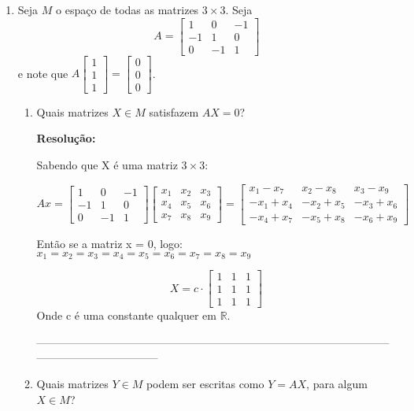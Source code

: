 \documentclass[leqno]{article}
\numberwithin{equation}{section}
\theoremstyle{definition}
\newcommand{\bR}{\mathbb{R}}
\newcommand{\bveccc}[3]{%
		\begin{bmatrix} #1 \\ #2 \\ #3  \end{bmatrix}
	}
\newenvironment{sol}
	{
		\vspace{4mm}
		\noindent\textbf{Resolução:}
		\strut\newline
		\smallskip
		\hspace{-3.5mm}
	}
	{}
\begin{document}
\begin{enumerate}
		\item Seja $M$ o espaço de todas as matrizes $3 \times 3$. Seja
		$$A = \begin{bmatrix}
			1 & 0 & -1 \\
			-1 & 1 & 0 \\
			0 & -1 & 1
		\end{bmatrix}$$
		e note que $A \bveccc{1}{1}{1} = \bveccc{0}{0}{0}$.
		
		\begin{enumerate}
			
			\item Quais matrizes $X \in M$ satisfazem $AX = 0$?
			
			\begin{sol} 
			Sabendo que X é uma matriz $3 \times 3$:
			
			$$Ax = 
			\begin{bmatrix}
			1 & 0 & -1 \\
			-1 & 1 & 0 \\
			0 & -1 & 1
			\end{bmatrix}
			\begin{bmatrix}
			x_1 & x_2 & x_3 \\
			x_4 & x_5 & x_6 \\
			x_7 & x_8 & x_9
			\end{bmatrix} =
			\begin{bmatrix}
			x_1 - x_7 & x_2 - x_8 & x_3 - x_9 \\
			-x_1 + x_4 & -x_2 + x_5 & -x_3 + x_6 \\
			-x_4 + x_7 & -x_5 + x_8 & -x_6 + x_9
			\end{bmatrix}$$
		
		Então se a matriz x = 0, logo: $x_1 = x_2 = x_3 = x_4 = x_5 = x_6 = x_7 = x_8 = x_9$
		
			$$X = c \cdot \begin{bmatrix}
					1 & 1 & 1 \\
					1 & 1 & 1 \\
					1 & 1 & 1
				\end{bmatrix}$$ Onde c é uma constante qualquer em $\bR$. 
			\end{sol} 
		
		---------------------------------------------------------------------------------------------------------------------------------\\
			\item Quais matrizes $Y \in M$ podem ser escritas como $Y = AX$, para algum $X \in M$?
			

\end{enumerate}
\end{enumerate}
\end{document}
